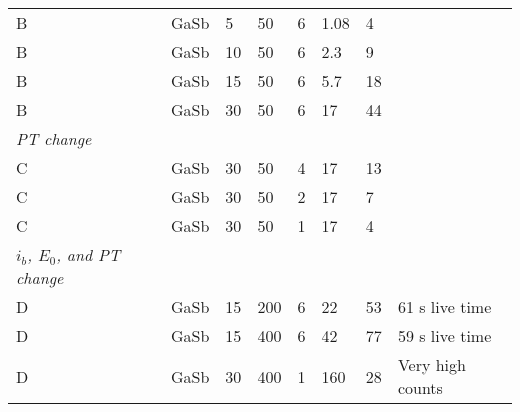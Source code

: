 \begin{table}[phtb]
\begin{center}
\begin{tabular}{lllllllp{3.5cm}}
            B                                  & GaSb            & 5              & 50             & 6           & 1.08         & 4           &                     \\
            B                                  & GaSb            & 10             & 50             & 6           & 2.3          & 9           &                     \\
            B                                  & GaSb            & 15             & 50             & 6           & 5.7          & 18          &                     \\
            B                                  & GaSb            & 30             & 50             & 6           & 17           & 44          &                     \\
            \hline
            \emph{PT change}                   &                 &                &                &             &              &             &                     \\
            C                                  & GaSb            & 30             & 50             & 4           & 17           & 13          &                     \\
            C                                  & GaSb            & 30             & 50             & 2           & 17           & 7           &                     \\
            C                                  & GaSb            & 30             & 50             & 1           & 17           & 4           &                     \\
            \hline
            \emph{$i_b$, $E_0$, and PT change} &                 &                &                &             &              &             &                     \\
            D                                  & GaSb            & 15             & 200            & 6           & 22           & 53          & 61 s live time      \\
            D                                  & GaSb            & 15             & 400            & 6           & 42           & 77          & 59 s live time      \\
            D                                  & GaSb            & 30             & 400            & 1           & 160          & 28          & Very high counts    \\

\end{tabular}
\end{center}
\end{table}
